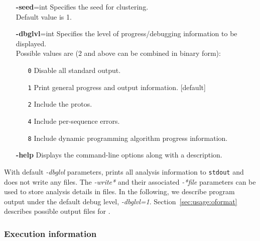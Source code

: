\documentclass[]{article}
\begin{document}
\begin{description}[align=left,style=nextline,leftmargin=*,font=\normalfont]
\begin{itemize}[leftmargin=+.8in]
    \item[\textbf{-seed}=int]
       Specifies the seed for clustering.\\
       Default value is 1.

    \item[\textbf{-dbglvl}=int]
       Specifies the level of progress/debugging information to be displayed.\\
       Possible values are (2 and above can be combined in binary form):
  	   \vspace{-5pt} 
       \begin{itemize}[leftmargin=+.6in]
         \item[\tt 0] Disable all standard output.
         \item[\tt 1] Print general progress and output information. [default]
         \item[\tt 2] Include the protos.
         \item[\tt 4] Include per-sequence errors.
         \item[\tt 8] Include dynamic programming algorithm progress information.
       \end{itemize}

    \item[\bf-help]
       Displays the command-line options along with a description.

  \end{itemize}

\end{description}

\vspace{30pt}

With default \emph{-dbglvl} parameters, \orionp prints all analysis information
to {\tt stdout} and does not write any files. The \emph{-write*} and their
associated \emph{-*file} parameters can be used to store analysis details in
files. In the following, we describe \orionp program output under the default
debug level, \emph{-dbglvl=1}. Section~\ref{sec:usage:oformat} describes
possible output files for \orionp.

\subsubsection{Execution information}
\label{sec:usage:orion:exec}
\end{document}
